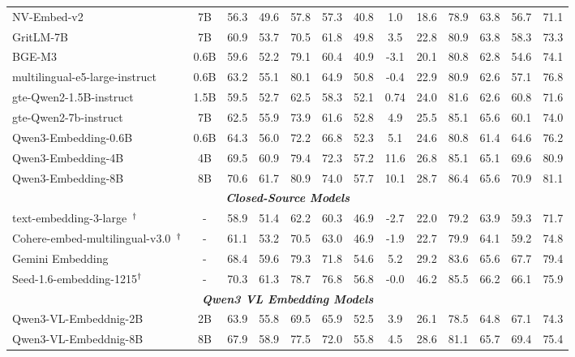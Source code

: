 \begin{table}[!t]
{\begin{tabular}{lc|cc|ccccccccc}
            NV-Embed-v2~\cite{lee2024nv} & 7B & 56.3 & 49.6 & 57.8 & 57.3 & 40.8 & 1.0 & 18.6 & 78.9 & 63.8 & 56.7 & 71.1 \\
            GritLM-7B~\citep{muennighoff2024generative} & 7B & 60.9 & 53.7 & 70.5 & 61.8 & 49.8 & 3.5 & 22.8 & 80.9 & 63.8 & 58.3 & 73.3 \\
            BGE-M3~\citep{chen-etal-2024-m3} & 0.6B & 59.6 & 52.2 & 79.1 & 60.4 & 40.9 & -3.1 & 20.1 & 80.8 & 62.8 & 54.6 & 74.1 \\
            multilingual-e5-large-instruct~\citep{wang2024multilingual} & 0.6B & 63.2 & 55.1 & 80.1 & 64.9 & 50.8 & -0.4 & 22.9 & 80.9 & 62.6 & 57.1 & 76.8 \\
            gte-Qwen2-1.5B-instruct~\citep{li2023towards} & 1.5B & 59.5 & 52.7 & 62.5 & 58.3 & 52.1 & 0.74 & 24.0 & 81.6 & 62.6 & 60.8 & 71.6 \\
            gte-Qwen2-7b-instruct~\citep{li2023towards} & 7B & 62.5 & 55.9 & 73.9 & 61.6 & 52.8 & 4.9 & 25.5 & 85.1 & 65.6 & 60.1 & 74.0 \\
            Qwen3-Embedding-0.6B~\citep{qwen3embedding} & 0.6B & 64.3 & 56.0 & 72.2 & 66.8 & 52.3 & 5.1 & 24.6 & 80.8 & 61.4 & 64.6 & 76.2 \\
            Qwen3-Embedding-4B~\citep{qwen3embedding} & 4B & 69.5 & 60.9 & 79.4 & 72.3 & 57.2 & 11.6 & 26.8 & 85.1 & 65.1 & 69.6 & 80.9 \\
            Qwen3-Embedding-8B~\citep{qwen3embedding} & 8B & 70.6 & 61.7 & 80.9 & 74.0 & 57.7 & 10.1 & 28.7 & 86.4 & 65.6 & 70.9 & 81.1 \\ 
            \hline
            \multicolumn{13}{c}{\textbf{\emph{Closed-Source Models}}} \\
            \hline
            text-embedding-3-large~\href{https://platform.openai.com/docs/models/text-embedding-3-large}{$\textsuperscript{\dag}$} & - & 58.9 & 51.4 & 62.2 & 60.3 & 46.9 & -2.7 & 22.0 & 79.2 & 63.9 & 59.3 & 71.7 \\
            Cohere-embed-multilingual-v3.0~\href{https://cohere.com/blog/introducing-embed-v3}{$\textsuperscript{\dag}$} & - & 61.1 & 53.2 & 70.5 & 63.0 & 46.9 & -1.9 & 22.7 & 79.9 & 64.1 & 59.2 & 74.8 \\
            Gemini Embedding~\citep{lee2025gemini} & - & 68.4 & 59.6 & 79.3 & 71.8 & 54.6 & 5.2 & 29.2 & 83.6 & 65.6 & 67.7 & 79.4 \\
            Seed-1.6-embedding-1215\href{https://seed1-6-embedding.github.io/}{$\textsuperscript{\dag}$} & - & 70.3 & 61.3 & 78.7 & 76.8 &  56.8 & -0.0 & 46.2 & 85.5 & 66.2 & 66.1 & 75.9 \\
            \hline
            \multicolumn{13}{c}{\textbf{\emph{Qwen3 VL Embedding Models}}} \\
            \hline
            Qwen3-VL-Embeddnig-2B & 2B & 63.9 & 55.8 & 69.5 & 65.9 & 52.5 & 3.9 & 26.1 & 78.5 & 64.8 & 67.1 & 74.3 \\
            Qwen3-VL-Embeddnig-8B & 8B & 67.9 & 58.9 & 77.5 & 72.0 & 55.8 & 4.5 & 28.6 & 81.1 & 65.7 & 69.4 & 75.4 \\
            \hline
        \end{tabular}
    }
\end{table}